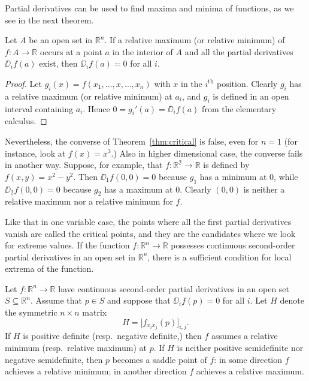 \documentclass[11pt]{article}
\begin{document}
Partial derivatives can be used to find maxima and minima of
functions, as we see in the next theorem.

\begin{thm}
  \label{thm:critical}
  Let $A$ be an open set in $\mathbb{R}^n$.  If a relative maximum (or relative
  minimum) of $f : A \rightarrow \mathbb{R}$ occurs at a point $a$ in the
  interior of $A$ and all the partial derivatives $\DD_i f(a)$ exist,
  then $\DD_i f(a) = 0$ for all $i$.
\end{thm}

\begin{proof}
Let $g_i(x) = f(x_1, \dots, x, \dots, x_n)$ with $x$ in the
$i^{\text{th}}$ position.  Clearly $g_i$ has a relative maximum (or
relative minimum) at $a_i$, and $g_i$ is defined in an open interval
containing $a_i$.  Hence $0 = g_i'(a) = \DD_i f(a)$ from the elementary
calculus.  
\end{proof}

\medskip

Nevertheless, the converse of Theorem~\ref{thm:critical} is false,
even for $n = 1$ (for instance, look at $f(x) = x^3$.)  Also in higher
dimensional case, the converse fails in another way.  Suppose, for
example, that $f: \mathbb{R}^2 \rightarrow \mathbb{R}$ is defined by $f(x,y) = x^2
- y^2$.  Then $\DD_1 f(0,0) = 0$ because $g_1$ has a minimum at $0$,
while $\DD_2 f(0,0) = 0$ because $g_2$ has a maximum at $0$.  Clearly
$(0,0)$ is neither a relative maximum nor a relative minimum for $f$.

Like that in one variable case, the points where all the first partial
derivatives vanish are called the {\sffamily critical points}, and
they are the candidates where we look for extreme values.  If the
function $f: \mathbb{R}^n \rightarrow \mathbb{R}$ possesses continuous
second-order partial derivatives in an open set in $\mathbb{R}^n$, there is
a sufficient condition for local extrema of the function.

\begin{thm}
  \label{thm:2_dev_criterion}
  Let $f : \mathbb{R}^n \rightarrow \mathbb{R}$ have continuous second-order
  partial derivatives in an open set $S \subseteq \mathbb{R}^n$.  Assume
  that $p \in S$ and suppose that $\DD_i f(p) = 0$ for all $i$.
  Let $H$ denote the symmetric $n \times n$ matrix
  \begin{equation*}
    H = \bigl[ f_{x_i x_j}(p) \bigr]_{i,j}.
  \end{equation*}
  If $H$ is positive definite (resp.~negative definite,) then $f$
  assumes a relative minimum (resp.~relative maximum) at $p$.  If
  $H$ is neither positive semidefinite nor negative semidefinite, then
  $p$ becomes a saddle point of $f$: in some direction $f$ achieves
  a relative minimum; in another direction $f$ achieves a relative
  maximum.
\end{thm}
\end{document}
